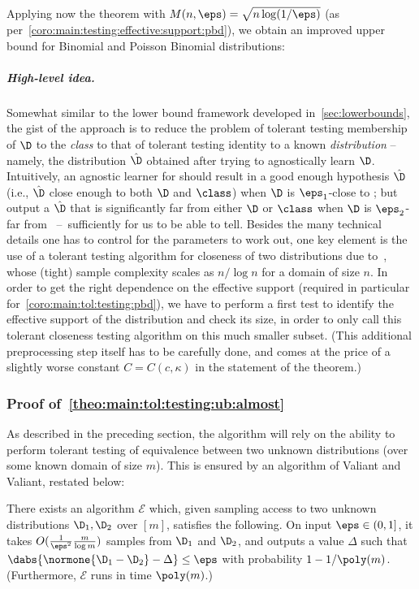 \coromaintoltestingmlogm*

Applying now the theorem with $M(n,\eps)=\sqrt{n\log(1/\eps)}$ (as per~\cref{coro:main:testing:effective:support:pbd}), we obtain an improved upper bound for Binomial and Poisson Binomial distributions: 
\coromaintoltestingpbd*

\subparagraph{High-level idea.} Somewhat similar to the lower bound framework developed in~\cref{sec:lowerbounds}, the gist of the approach is to reduce the problem of tolerant testing membership of $\D$ to the \emph{class} \class to that of tolerant testing identity to a known \emph{distribution} -- namely, the distribution $\hat{\D}$ obtained after trying to agnostically learn $\D$. Intuitively, an agnostic learner for \class should result in a good enough hypothesis $\hat{\D}$ (i.e., $\hat{\D}$ close enough to both $\D$ and $\class$) when $\D$ is $\eps_1$-close to \class; but output a $\hat{\D}$ that is significantly far from either $\D$ or $\class$ when $\D$ is $\eps_2$-far from \class~--~sufficiently for us to be able to tell.
Besides the many technical details one has to control for the parameters to work out, one key element is the use of a tolerant testing algorithm for closeness of two distributions due to~\cite{VV:11:focs}, whose (tight) sample complexity scales as $n/\log n$ for a domain of size $n$. In order to get the right dependence on the effective support (required in particular for~\cref{coro:main:tol:testing:pbd}), we have to perform a first test to identify the effective support of the distribution and check its size, in order to only call this tolerant closeness testing algorithm on this much smaller subset. (This additional preprocessing step itself has to be carefully done, and comes at the price of a slightly worse constant $C=C(c,\kappa)$ in the statement of the theorem.)

\subsubsection{Proof of~\cref{theo:main:tol:testing:ub:almost}}

As described in the preceding section, the algorithm will rely on the ability to perform tolerant testing of equivalence between two unknown distributions (over some known domain of size $m$). This is ensured by an algorithm of Valiant and Valiant, restated below:
\begin{theorem}\label{theo:samp:closeness:tolerant}
    There exists an algorithm $\mathcal{E}$ which, given sampling access to two unknown distributions $\D_1,\D_2$ over $[m]$, satisfies the following. On input $\eps\in(0,1]$, it takes $O( \frac{1}{\eps^2}\frac{m}{\log m} )$ samples from $\D_1$ and $\D_2$, and outputs a value $\Delta$ such that $\dabs{\normone{\D_1-\D_2}-\Delta} \leq \eps$ with probability $1-1/\poly(m)$. (Furthermore, $\mathcal{E}$ runs in time $\poly(m)$.)
\end{theorem}

